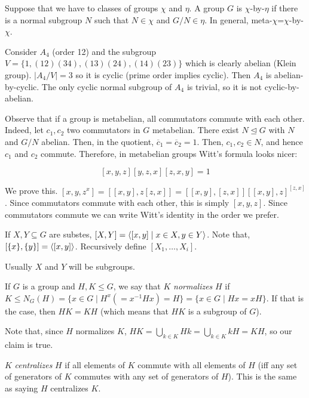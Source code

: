 \documentclass[twoside, 11pt]{article}
\begin{document}
Suppose that we have to classes of groups $\chi$ and $\eta$. A group $G$ is $\chi$-by-$\eta$ if there is a normal subgroup $N$ such that $N\in\chi$ and $G/N\in\eta$. In general, meta-$\chi$=$\chi$-by-$\chi$. 

\begin{ej}
Consider $A_4$ (order 12) and the subgroup $V=\{1, (12)(34), (13)(24),(14)(23)\}$ which is clearly abelian (Klein group). $|A_4/V|=3$ so it is cyclic (prime order implies cyclic). Then $A_4$ is abelian-by-cyclic. The only cyclic normal subgroup of $A_4$ is trivial, so it is not cyclic-by-abelian. 
\end{ej}

Observe that if a group is metabelian, all commutators commute with each other. Indeed, let $c_1, c_2$ two commutators in $G$ metabelian. There exist $N\trianglelefteq G$ with $N$ and $G/N$ abelian. Then, in the quotient, $\overline{c}_1=\overline{c}_2=1$. Then, $c_1,c_2\in N$, and hence $c_1$ and $c_2$ commute. Therefore, in metabelian groups Witt's formula looks nicer:

$$[x,y,z][y,z,x][z,x,y]=1$$

We prove this. $[x,y,z^x]=[[x,y],z[z,x]]=[[x,y], [z,x]][[x,y],z]^{[z,x]}$. Since commutators commute with each other, this is simply $[x,y,z]$. Since commutators commute we can write Witt's identity in the order we prefer. 

\begin{defi}
If $X,Y\subseteq G$ are substes, $[X,Y]=\langle{[x,y]\mid x\in X, y\in Y}\rangle$. Note that, $[\{x\},\{y\}]=\langle{[x,y]}\rangle$. Recursively define $[X_1,\dots, X_i]$.
\end{defi}
Usually $X$ and $Y$ will be subgroups. 

\begin{defi}
If $G$ is a group and $H,K\leq G$, we say that $K$ \emph{normalizes} $H$ if $K\leq N_G(H)=\{x\in G\mid H^x(=x^{-1}Hx)=H\}=\{x\in G\mid Hx=xH\}$. If that is the case, then $HK=KH$ (which means that $HK$ is a subgroup of $G$). 
\end{defi}
Note that, since $H$ normalizes $K$,  $HK=\bigcup_{k\in K}Hk=\bigcup_{k\in K}kH=KH$, so our claim is true.

\begin{defi}
$K$ \emph{centralizes} $H$ if all elements of $K$ commute with all elements of $H$ (iff any set of generators of $K$ commutes with any set of generators of $H$). This is the same as saying $H$ centralizes $K$.
\end{defi}
\end{document}
